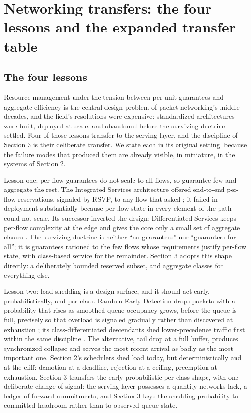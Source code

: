 \section{Networking transfers: the four lessons and the expanded transfer table}



\subsection{The four lessons}

Resource management under the tension between per-unit guarantees and
aggregate efficiency is the central design problem of packet networking's
middle decades, and the field's resolutions were expensive: standardized
architectures were built, deployed at scale, and abandoned before the
surviving doctrine settled. Four of those lessons transfer to the serving
layer, and the discipline of Section 3 is their deliberate transfer. We
state each in its original setting, because the failure modes that
produced them are already visible, in miniature, in the systems of
Section 2.

Lesson one: per-flow guarantees do not scale to all flows, so guarantee
few and aggregate the rest. The Integrated Services architecture offered
end-to-end per-flow reservations, signaled by RSVP, to any flow that
asked \citep{rfc2205}; it failed in deployment substantially because per-flow
state in every element of the path could not scale. Its successor
inverted the design: Differentiated Services keeps per-flow complexity at
the edge and gives the core only a small set of aggregate classes
\citep{rfc2475}. The surviving doctrine is neither ``no guarantees'' nor
``guarantees for all''; it is guarantees rationed to the few flows whose
requirements justify per-flow state, with class-based service for the
remainder. Section 3 adopts this shape directly: a deliberately bounded
reserved subset, and aggregate classes for everything else.

Lesson two: load shedding is a design surface, and it should act early,
probabilistically, and per class. Random Early Detection drops packets
with a probability that rises as smoothed queue occupancy grows, before
the queue is full, precisely so that overload is signaled gradually
rather than discovered at exhaustion \citep{floyd1993red}; its
class-differentiated descendants shed lower-precedence traffic first
within the same discipline \citep{rfc2597}. The alternative, tail drop at a
full buffer, produces synchronized collapse and serves the most recent
arrival as badly as the most important one. Section 2's schedulers shed
load today, but deterministically and at the cliff: demotion at a
deadline, rejection at a ceiling, preemption at exhaustion. Section 3
transfers the early-probabilistic-per-class shape, with one deliberate
change of signal: the serving layer possesses a quantity networks lack, a
ledger of forward commitments, and Section 3 keys the shedding
probability to committed headroom rather than to observed queue state.

